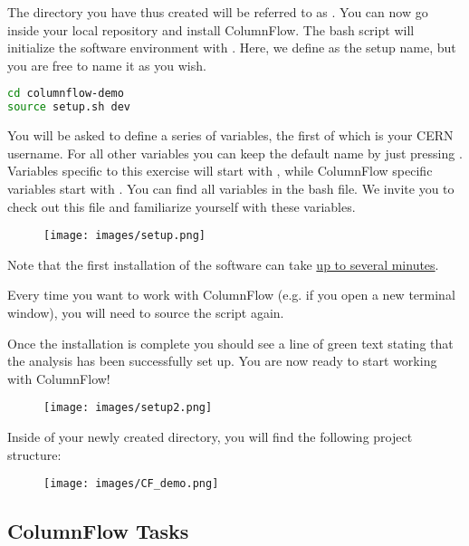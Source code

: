The directory you have thus created will be referred to as . You can now go inside your local repository and install ColumnFlow. The  bash script will initialize the software environment with . Here, we define  as the setup name, but you are free to name it as you wish.

\begin{lstlisting}[language=bash]
cd columnflow-demo
source setup.sh dev
\end{lstlisting}

You will be asked to define a series of variables, the first of which is your CERN username. For all other variables you can keep the default name by just pressing . Variables specific to this exercise will start with , while ColumnFlow specific variables start with . You can find all variables in the  bash file. We invite you to check out this file and familiarize yourself with these variables.

\begin{figure}[!h]
    \centering
    \texttt{[image: images/setup.png]}
\end{figure}

Note that the first installation of the software can take \underline{up to several minutes}. 

Every time you want to work with ColumnFlow (e.g. if you open a new terminal window), you will need to source the  script again.

Once the installation is complete you should see a line of green text stating that the analysis has been successfully set up. You are now ready to start working with ColumnFlow! 

\begin{figure}[!h]
    \centering
    \texttt{[image: images/setup2.png]}
\end{figure}

Inside of your newly created  directory, you will find the following project structure:
\begin{figure}[!h]
    \centering
    \texttt{[image: images/CF\_demo.png]}
\end{figure}

\subsection{ColumnFlow Tasks}

